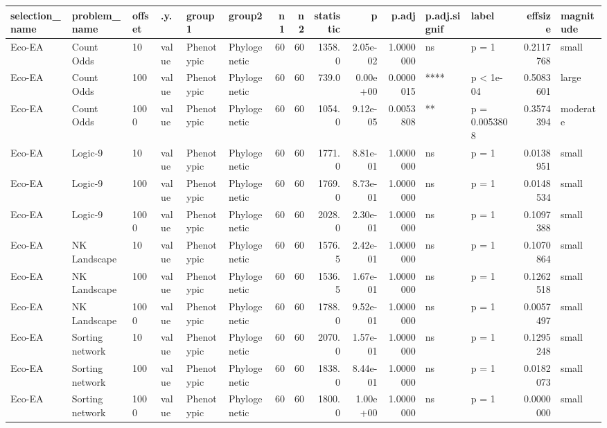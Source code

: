 \documentclass[]{book}
\begin{document}
\begin{table}
\centering
\begin{tabular}[t]{l|l|l|l|l|l|r|r|r|r|r|l|l|r|l}
\hline
selection\_name & problem\_name & offset & .y. & group1 & group2 & n1 & n2 & statistic & p & p.adj & p.adj.signif & label & effsize & magnitude\\
\hline
Eco-EA & Count Odds & 10 & value & Phenotypic & Phylogenetic & 60 & 60 & 1358.0 & 2.05e-02 & 1.0000000 & ns & p = 1 & 0.2117768 & small\\
\hline
Eco-EA & Count Odds & 100 & value & Phenotypic & Phylogenetic & 60 & 60 & 739.0 & 0.00e+00 & 0.0000015 & **** & p < 1e-04 & 0.5083601 & large\\
\hline
Eco-EA & Count Odds & 1000 & value & Phenotypic & Phylogenetic & 60 & 60 & 1054.0 & 9.12e-05 & 0.0053808 & ** & p = 0.0053808 & 0.3574394 & moderate\\
\hline
Eco-EA & Logic-9 & 10 & value & Phenotypic & Phylogenetic & 60 & 60 & 1771.0 & 8.81e-01 & 1.0000000 & ns & p = 1 & 0.0138951 & small\\
\hline
Eco-EA & Logic-9 & 100 & value & Phenotypic & Phylogenetic & 60 & 60 & 1769.0 & 8.73e-01 & 1.0000000 & ns & p = 1 & 0.0148534 & small\\
\hline
Eco-EA & Logic-9 & 1000 & value & Phenotypic & Phylogenetic & 60 & 60 & 2028.0 & 2.30e-01 & 1.0000000 & ns & p = 1 & 0.1097388 & small\\
\hline
Eco-EA & NK Landscape & 10 & value & Phenotypic & Phylogenetic & 60 & 60 & 1576.5 & 2.42e-01 & 1.0000000 & ns & p = 1 & 0.1070864 & small\\
\hline
Eco-EA & NK Landscape & 100 & value & Phenotypic & Phylogenetic & 60 & 60 & 1536.5 & 1.67e-01 & 1.0000000 & ns & p = 1 & 0.1262518 & small\\
\hline
Eco-EA & NK Landscape & 1000 & value & Phenotypic & Phylogenetic & 60 & 60 & 1788.0 & 9.52e-01 & 1.0000000 & ns & p = 1 & 0.0057497 & small\\
\hline
Eco-EA & Sorting network & 10 & value & Phenotypic & Phylogenetic & 60 & 60 & 2070.0 & 1.57e-01 & 1.0000000 & ns & p = 1 & 0.1295248 & small\\
\hline
Eco-EA & Sorting network & 100 & value & Phenotypic & Phylogenetic & 60 & 60 & 1838.0 & 8.44e-01 & 1.0000000 & ns & p = 1 & 0.0182073 & small\\
\hline
Eco-EA & Sorting network & 1000 & value & Phenotypic & Phylogenetic & 60 & 60 & 1800.0 & 1.00e+00 & 1.0000000 & ns & p = 1 & 0.0000000 & small\\

\end{tabular}
\end{table}
\end{document}
